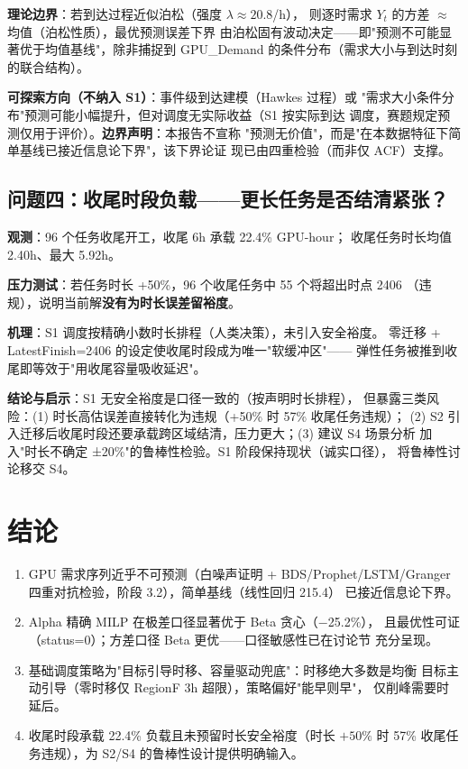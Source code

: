 \documentclass{internal-report}
\begin{document}
\textbf{理论边界}：若到达过程近似泊松（强度 $\lambda\approx20.8$/h），
则逐时需求 $Y_t$ 的方差 $\approx$ 均值（泊松性质），最优预测误差下界
由泊松固有波动决定——即"预测不可能显著优于均值基线"，除非捕捉到
GPU\_Demand 的条件分布（需求大小与到达时刻的联合结构）。

\textbf{可探索方向（不纳入 S1）}：事件级到达建模（Hawkes 过程）或
"需求大小条件分布"预测可能小幅提升，但对调度无实际收益（S1 按实际到达
调度，赛题规定预测仅用于评价）。\textbf{边界声明}：本报告不宣称
"预测无价值"，而是"在本数据特征下简单基线已接近信息论下界"，该下界论证
现已由四重检验（而非仅 ACF）支撑。

\subsection{问题四：收尾时段负载——更长任务是否结清紧张？}

\textbf{观测}：96 个任务收尾开工，收尾 6h 承载 22.4\% GPU-hour；
收尾任务时长均值 2.40h、最大 5.92h。

\textbf{压力测试}：若任务时长 +50\%，96 个收尾任务中 55 个将超出时点 2406
（违规），说明当前解\textbf{没有为时长误差留裕度}。

\textbf{机理}：S1 调度按精确小数时长排程（人类决策），未引入安全裕度。
零迁移 + LatestFinish=2406 的设定使收尾时段成为唯一"软缓冲区"——
弹性任务被推到收尾即等效于"用收尾容量吸收延迟"。

\textbf{结论与启示}：S1 无安全裕度是口径一致的（按声明时长排程），
但暴露三类风险：(1) 时长高估误差直接转化为违规（+50\% 时 57\% 收尾任务违规）；
(2) S2 引入迁移后收尾时段还要承载跨区域结清，压力更大；(3) 建议 S4 场景分析
加入"时长不确定 ±20\%"的鲁棒性检验。S1 阶段保持现状（诚实口径），
将鲁棒性讨论移交 S4。

\section{结论}

\begin{enumerate}
  \item GPU 需求序列近乎不可预测（白噪声证明 + BDS/Prophet/LSTM/Granger
        四重对抗检验，阶段 3.2），简单基线（线性回归 215.4）
        已接近信息论下界。
  \item Alpha 精确 MILP 在极差口径显著优于 Beta 贪心（$-$25.2\%），
        且最优性可证（status=0）；方差口径 Beta 更优——口径敏感性已在讨论节
        充分呈现。
  \item 基础调度策略为"目标引导时移、容量驱动兜底"：时移绝大多数是均衡
        目标主动引导（零时移仅 RegionF 3h 超限），策略偏好"能早则早"，
        仅削峰需要时延后。
  \item 收尾时段承载 22.4\% 负载且未预留时长安全裕度（时长 $+50\%$ 时
        57\% 收尾任务违规），为 S2/S4 的鲁棒性设计提供明确输入。
\end{enumerate}
\end{document}
